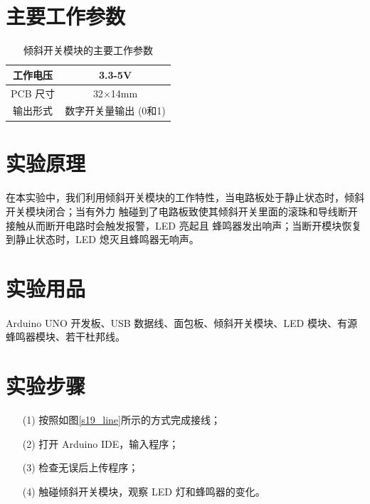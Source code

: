 \documentclass[UTF8, oneside]{ctexbook}
\begin{document}
\section{主要工作参数}
\newpage
\begin{table}[h]
    \centering
    \begin{tabular}{|c|c|}
    \hline
    工作电压   & 3.3-5V         \\ \hline
    PCB 尺寸 & 32$\times$14mm \\ \hline
    输出形式   & 数字开关量输出 (0和1)  \\ \hline
    \end{tabular}
    \caption{倾斜开关模块的主要工作参数}
\end{table}

\section{实验原理}
\paragraph{}
在本实验中，我们利用倾斜开关模块的工作特性，当电路板处于静止状态时，倾斜开关模块闭合；当有外力
触碰到了电路板致使其倾斜开关里面的滚珠和导线断开接触从而断开电路时会触发报警，LED 亮起且
蜂鸣器发出响声；当断开模块恢复到静止状态时，LED 熄灭且蜂鸣器无响声。

\section{实验用品}
\paragraph{}
Arduino UNO 开发板、USB 数据线、面包板、倾斜开关模块、LED 模块、有源蜂鸣器模块、若干杜邦线。

\section{实验步骤}
\begin{itemize}
    \item[(1)] 按照如图\ref{s19_line}所示的方式完成接线；
    \item[(2)] 打开 Arduino IDE，输入程序；
    \item[(3)] 检查无误后上传程序；
    \item[(4)] 触碰倾斜开关模块，观察 LED 灯和蜂鸣器的变化。
\end{itemize}
\end{document}
